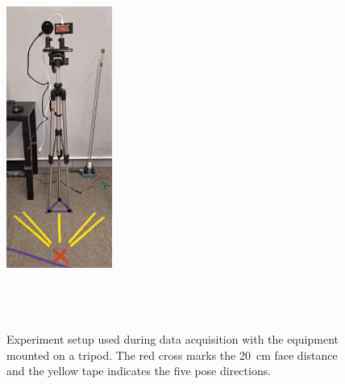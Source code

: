 \documentclass{mpaper}
\begin{document}
\begin{figure}[t]
    \centering
    \vspace{-0.5cm}
    \includegraphics[width=0.31\textwidth, height=12.5cm]{figures/experiment_setup.pdf}
    \vspace{0.2cm}
    \caption{Experiment setup used during data acquisition with the equipment mounted on a tripod. The red cross marks the \qty{20}{\cm} face distance and the yellow tape indicates the five pose directions.}
    \label{fig:experiment_setup}
    \vspace{-0.7cm}
\end{figure}


\begin{table}[b!]
    \centering
    \vspace{-0.5cm}
    \vspace{0.1cm}
    \caption{Table displaying the full forms of abbreviations describing the experimental conditions}
    \label{tab:abbreviated_conditions}
    \vspace{-0.9cm}
\end{table}
\end{document}
